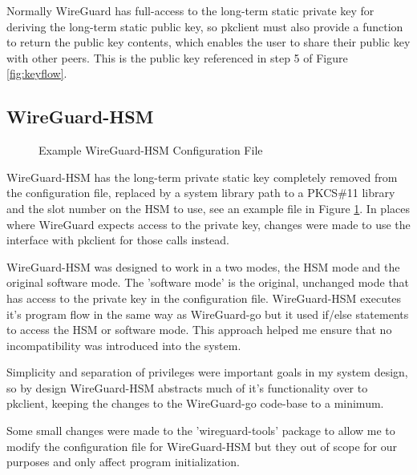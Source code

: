 \documentclass [11pt, proquest] {uwthesis}[2020/02/24]
\begin{document}
Normally WireGuard has full-access to the long-term static private key for deriving the long-term static public key, so pkclient must also provide a function to return the public key contents, which enables the user to share their public key with other peers. This is the public key referenced in step 5 of Figure \ref{fig:keyflow}.

\subsection{WireGuard-HSM}

\begin{figure}
\begin{center}
\caption{Example WireGuard-HSM Configuration File}
\label{fig:wg_hsm_config}
\end{center}
\end{figure}
WireGuard-HSM has the long-term private static key completely removed from the configuration file, replaced by a system library path to a PKCS\#11 library and the slot number on the HSM to use, see an example file in Figure \ref{fig:wg_hsm_config}.  In places where WireGuard expects access to the private key, changes were made to use the interface with pkclient for those calls instead.

WireGuard-HSM was designed to work in a two modes, the HSM mode and the original software mode. 
The 'software mode' is the original, unchanged mode that has access to the private key in the configuration file. WireGuard-HSM executes it's program flow in the same way as WireGuard-go but it used if/else statements to access the HSM or software mode. This approach helped me ensure that no incompatibility was introduced into the system. 

Simplicity and separation of privileges were important goals in my system design, so by design WireGuard-HSM abstracts much of it's functionality over to pkclient, keeping the changes to the WireGuard-go code-base to a minimum. 

Some small changes were made to the 'wireguard-tools' package to allow me to modify the configuration file for WireGuard-HSM but they out of scope for our purposes and only affect program initialization.
\end{document}
